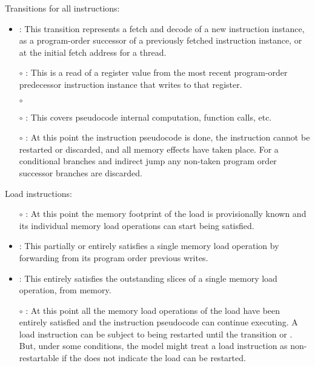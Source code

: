 \noindent Transitions for all instructions:
\begin{itemize}
\item {}: This transition represents a fetch and decode of a new instruction instance, as a program-order successor of a previously fetched instruction instance, or at the initial fetch address for a thread.
\item[$\circ$] : This is a read of a register value from the most recent program-order predecessor instruction instance that writes to that register.
\item[$\circ$] 
\item[$\circ$] : This covers pseudocode internal computation, function calls, etc.
\item[$\circ$] : At this point the instruction pseudocode is done, the instruction cannot be restarted or discarded, and all memory effects have taken place. For a conditional branches and indirect jump any non-taken program order successor branches are discarded.
\end{itemize}

\noindent Load instructions:
\begin{itemize}
\item[$\circ$] : At this point the memory footprint of the load is provisionally known and its individual memory load operations can start being satisfied.
\item {}: This partially or entirely satisfies a single memory load operation by forwarding from its program order previous writes.
\item {}: This entirely satisfies the outstanding slices of a single memory load operation, from memory.
\item[$\circ$] : At this point all the memory load operations of the load have been entirely satisfied and the instruction pseudocode can continue executing.
A load instruction can be subject to being restarted until the  transition or .
But, under some conditions, the model might treat a load instruction as non-restartable if the  does not indicate the load can be restarted.
\end{itemize}

